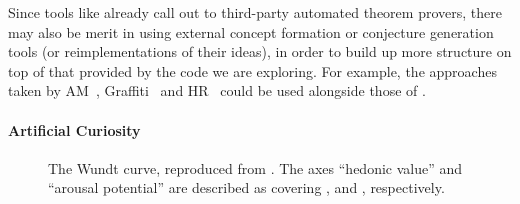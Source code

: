 Since tools like \hipspec{} already call out to third-party automated theorem
provers, there may also be merit in using external concept formation or
conjecture generation tools (or reimplementations of their ideas), in order to
build up more structure on top of that provided by the code we are exploring.
For example, the approaches taken by
AM~\cite{lenat1977automated, lenat1979automated},
Graffiti~\cite{delavina2005some, delavina2005graffiti} and
HR~\cite{colton1999automatic, colton2000agent} could be used alongside those of
\quickspec{}.

\paragraph{Artificial Curiosity} \label{sec:curiosity} \leavevmode \newline

\begin{figure}
  \centering

  \caption{The Wundt curve, reproduced from \cite{berlyne1970novelty}. The axes ``hedonic value'' and ``arousal potential'' are described as covering , and , respectively.}

  \label{fig:wundt}
\end{figure}

